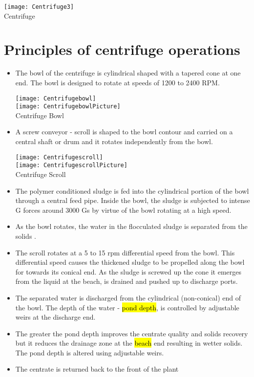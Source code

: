 			\begin{center}
				\texttt{[image: Centrifuge3]}\\
				Centrifuge
			\end{center}
\section{Principles of centrifuge operations}
				\begin{itemize}
					\item The bowl of the centrifuge is cylindrical shaped with a tapered cone at one end.  The bowl is designed to rotate at speeds of 1200 to 2400 RPM.
						\begin{center}
							\texttt{[image: Centrifugebowl]}\\
							\vspace{1cm}
							\texttt{[image: CentrifugebowlPicture]}\\
							Centrifuge Bowl
						\end{center}
					\item A screw conveyor - scroll is shaped to the bowl  contour and carried on a central shaft or drum and it rotates independently from the bowl.  
						\begin{center}
							\texttt{[image: Centrifugescroll]}\\
							\vspace{1cm}
							\texttt{[image: CentrifugescrollPicture]}\\
							Centrifuge Scroll
						\end{center}
					\item The polymer conditioned sludge is fed into the cylindrical portion of the bowl through a central feed pipe.  Inside the bowl, the sludge is subjected to intense G forces around 3000 Gs by virtue of the bowl rotating at a high speed. 
					\item As the bowl rotates, the water in the flocculated sludge is separated from the solids .  
					\item The scroll rotates at a 5 to 15 rpm differential speed from the bowl.  This differential speed causes the thickened  sludge to be propelled  along the bowl for towards its conical end.  As the sludge is screwed up the cone it emerges from the liquid at the beach, is drained and pushed up to discharge ports.  
					\item The separated water is discharged from the cylindrical (non-conical) end of the bowl.  The depth of the water - \hl{pond depth}, is controlled by adjustable weirs at the discharge end.
					\item The greater the pond depth improves the centrate quality and solids recovery but it reduces the drainage zone at the \hl{beach} end resulting in wetter solids.  The pond depth is altered using adjustable weirs.
					\item The centrate is returned back to the front of the plant 
				\end{itemize}
	
